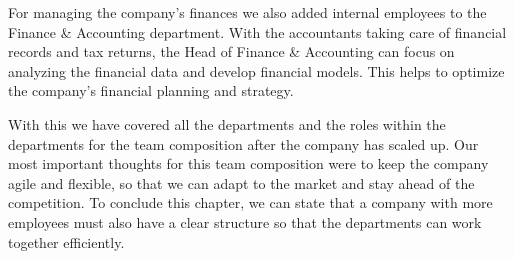 \p
For managing the company's finances we also added internal employees to the Finance \& Accounting department.
With the accountants taking care of financial records and tax returns, the Head of Finance \& Accounting can focus on analyzing the financial data and develop financial models.
This helps to optimize the company's financial planning and strategy.

\p
With this we have covered all the departments and the roles within the departments for the team composition after the company has scaled up.
Our most important thoughts for this team composition were to keep the company agile and flexible, so that we can adapt to the market and stay ahead of the competition.
To conclude this chapter, we can state that a company with more employees must also have a clear structure so that the departments can work together efficiently.